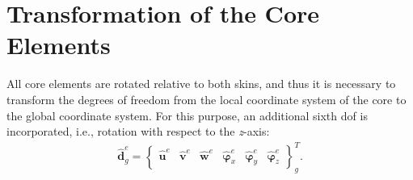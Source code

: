 \section{Transformation of the Core Elements}
\label{sec:transformation}

All core elements are rotated relative to both skins, and thus it is necessary to transform the degrees of freedom from the local coordinate system of the core to the global coordinate system.
For this purpose, an additional sixth \ac{dof} is incorporated, i.e., rotation with respect to the \textit{z}-axis:
\begin{eqnarray}
	\widehat{\textbf{d}}^e_g = \left \{\begin{array}{cccccc}
		\widehat{\textbf{u}}^e & \widehat{\textbf{v}}^e &
		\widehat{\textbf{w}}^e & \widehat{\boldsymbol{\varphi}}_x^e &
		\widehat{\boldsymbol{\varphi}}_y^e & \widehat{\boldsymbol{\varphi}}_z^e
	\end{array}\right \}^T_g.
	\label{eq:d6}
\end{eqnarray}

